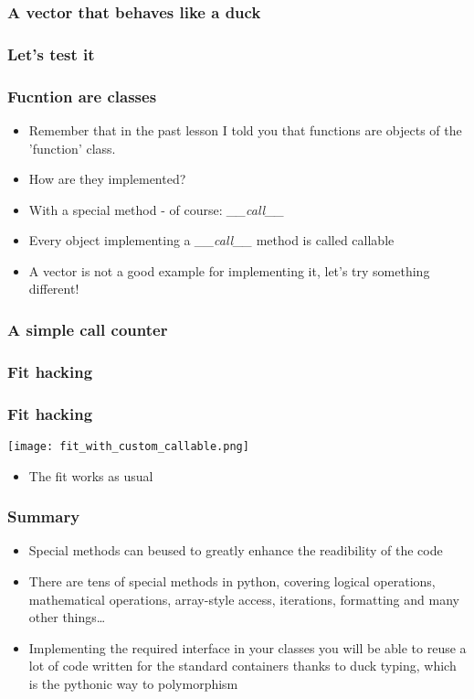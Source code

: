 \documentclass[9pt]{beamer}
\begin{document}
\begin{frame}
  \frametitle{A vector that behaves like a duck}
  
\end{frame}


\begin{frame}
  \frametitle{Let's test it}
  
\end{frame}


\begin{frame}
  \frametitle{Fucntion are classes}
  
  \begin{itemize}
    \item Remember that in the past lesson I told you that functions are objects
          of the 'function' class.
    \medskip
    \item How are they implemented?
    \medskip
    \item With a special method - of course: \emph{\_\_call\_\_}
    \medskip
    \item Every object implementing a \emph{\_\_call\_\_} method is called \alert{callable}
    \medskip
    \item A vector is not a good example for implementing it, let's try something
          different!
  \end{itemize}
  
\end{frame}


\begin{frame}
  \frametitle{A simple call counter}
  
\end{frame}


\begin{frame}
  \frametitle{Fit hacking}
  
\end{frame}


\begin{frame}
  \frametitle{Fit hacking}
  \centering
  \texttt{[image: fit\_with\_custom\_callable.png]}
  
  \medskip
  
  \begin{itemize}
    \item The fit works as usual
   \end{itemize}  
\end{frame}



\begin{frame}
  \frametitle{Summary}
  \begin{itemize}
    \item Special methods can beused to greatly enhance the readibility of the code
    \bigskip
    \item There are tens of special methods in python, covering logical operations,
          mathematical operations, array-style access, iterations, formatting and
          many other things\dots
    \bigskip
    \item Implementing the required interface in your classes you will be able
          to reuse a lot of code written for the standard containers thanks to
          duck typing, which is the pythonic way to polymorphism
   \end{itemize}  
\end{frame}
\end{document}
